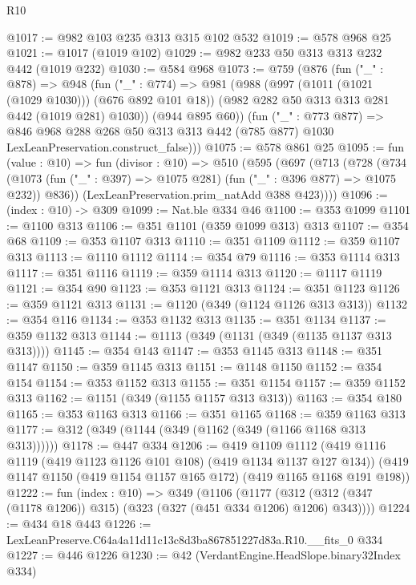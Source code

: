 \begin{lexlean}{R10}
\begin{coremodule}
@1017 := @982 @103 @235 @313 @315 @102 @532
@1019 := @578 @968 @25
@1021 := @1017 (@1019 @102)
@1029 := @982 @233 @50 @313 @313 @232 @442 (@1019 @232)
@1030 := @584 @968
@1073 := @759
    (@876
      (fun ("_" : @878) =>
      @948
        (fun ("_" : @774) =>
        @981
          (@988
            (@997 (@1011 (@1021 (@1029 @1030))) (@676 @892 @101 @18))
            (@982 @282 @50 @313 @313 @281 @442 (@1019 @281) @1030))
          (@944 @895 @60))
        (fun ("_" : @773 @877) =>
        @846
          @968
          @288
          @268
          @50
          @313
          @313
          @442
          (@785 @877)
          @1030
          LexLeanPreservation.construct_false)))
@1075 := @578 @861 @25
@1095 := fun (value : @10) =>
  fun (divisor : @10) =>
  @510
    (@595
      (@697
        (@713
          (@728
            (@734
              (@1073 (fun ("_" : @397) => @1075 @281) (fun ("_" : @396 @877) => @1075 @232))
              @836))
          (LexLeanPreservation.prim_natAdd @388 @423))))
@1096 := (index : @10) -> @309
@1099 := Nat.ble @334 @46
@1100 := @353 @1099
@1101 := @1100 @313
@1106 := @351 @1101 (@359 @1099 @313) @313
@1107 := @354 @68
@1109 := @353 @1107 @313
@1110 := @351 @1109
@1112 := @359 @1107 @313
@1113 := @1110 @1112
@1114 := @354 @79
@1116 := @353 @1114 @313
@1117 := @351 @1116
@1119 := @359 @1114 @313
@1120 := @1117 @1119
@1121 := @354 @90
@1123 := @353 @1121 @313
@1124 := @351 @1123
@1126 := @359 @1121 @313
@1131 := @1120 (@349 (@1124 @1126 @313 @313))
@1132 := @354 @116
@1134 := @353 @1132 @313
@1135 := @351 @1134
@1137 := @359 @1132 @313
@1144 := @1113 (@349 (@1131 (@349 (@1135 @1137 @313 @313))))
@1145 := @354 @143
@1147 := @353 @1145 @313
@1148 := @351 @1147
@1150 := @359 @1145 @313
@1151 := @1148 @1150
@1152 := @354 @154
@1154 := @353 @1152 @313
@1155 := @351 @1154
@1157 := @359 @1152 @313
@1162 := @1151 (@349 (@1155 @1157 @313 @313))
@1163 := @354 @180
@1165 := @353 @1163 @313
@1166 := @351 @1165
@1168 := @359 @1163 @313
@1177 := @312 (@349 (@1144 (@349 (@1162 (@349 (@1166 @1168 @313 @313))))))
@1178 := @447 @334
@1206 := @419
    @1109
    @1112
    (@419 @1116 @1119 (@419 @1123 @1126 @101 @108) (@419 @1134 @1137 @127 @134))
    (@419 @1147 @1150 (@419 @1154 @1157 @165 @172) (@419 @1165 @1168 @191 @198))
@1222 := fun (index : @10) =>
  @349
    (@1106
      (@1177 (@312 (@312 (@347 (@1178 @1206)) @315) (@323 (@327 (@451 @334 @1206) @1206) @343))))
@1224 := @434 @18 @443
@1226 := LexLeanPreserve.C64a4a11d11c13c8d3ba867851227d83a.R10.__fits_0 @334
@1227 := @446 @1226
@1230 := @42 (VerdantEngine.HeadSlope.binary32Index @334)

\end{coremodule}
\end{lexlean}
